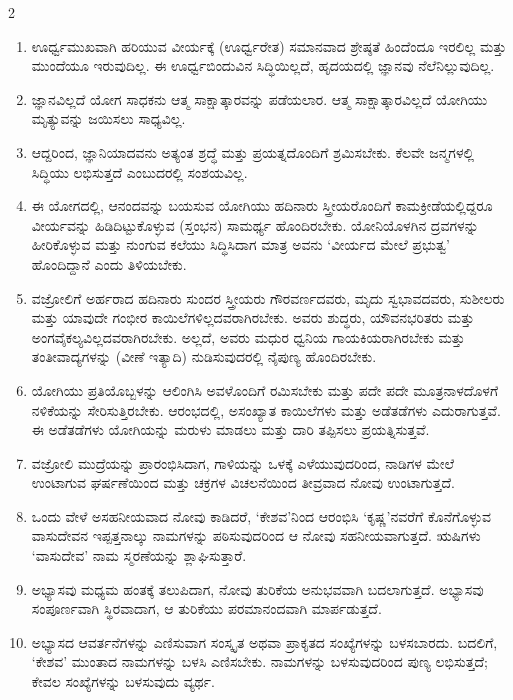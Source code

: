 \begin{multicols}{2}
\begin{kan}


\begin{enumerate}[nosep]
\item[38.] ಊರ್ಧ್ವಮುಖವಾಗಿ ಹರಿಯುವ ವೀರ್ಯಕ್ಕೆ (ಊರ್ಧ್ವರೇತ) ಸಮಾನವಾದ ಶ್ರೇಷ್ಠತೆ ಹಿಂದೆಂದೂ ಇರಲಿಲ್ಲ ಮತ್ತು ಮುಂದೆಯೂ ಇರುವುದಿಲ್ಲ. ಈ ಊರ್ಧ್ವಬಿಂದುವಿನ ಸಿದ್ಧಿಯಿಲ್ಲದೆ, ಹೃದಯದಲ್ಲಿ ಜ್ಞಾನವು ನೆಲೆನಿಲ್ಲುವುದಿಲ್ಲ.
\item[39.] ಜ್ಞಾನವಿಲ್ಲದೆ ಯೋಗ ಸಾಧಕನು ಆತ್ಮ ಸಾಕ್ಷಾತ್ಕಾರವನ್ನು ಪಡೆಯಲಾರ. ಆತ್ಮ ಸಾಕ್ಷಾತ್ಕಾರವಿಲ್ಲದೆ ಯೋಗಿಯು ಮೃತ್ಯುವನ್ನು ಜಯಿಸಲು ಸಾಧ್ಯವಿಲ್ಲ.
\item[40.] ಆದ್ದರಿಂದ, ಜ್ಞಾನಿಯಾದವನು ಅತ್ಯಂತ ಶ್ರದ್ಧೆ ಮತ್ತು ಪ್ರಯತ್ನದೊಂದಿಗೆ ಶ್ರಮಿಸಬೇಕು. ಕೆಲವೇ ಜನ್ಮಗಳಲ್ಲಿ ಸಿದ್ಧಿಯು ಲಭಿಸುತ್ತದೆ ಎಂಬುದರಲ್ಲಿ ಸಂಶಯವಿಲ್ಲ.
\item[41.] ಈ ಯೋಗದಲ್ಲಿ, ಆನಂದವನ್ನು ಬಯಸುವ ಯೋಗಿಯು ಹದಿನಾರು ಸ್ತ್ರೀಯರೊಂದಿಗೆ ಕಾಮಕ್ರೀಡೆಯಲ್ಲಿದ್ದರೂ ವೀರ್ಯವನ್ನು ಹಿಡಿದಿಟ್ಟುಕೊಳ್ಳುವ (ಸ್ತಂಭನ) ಸಾಮರ್ಥ್ಯ ಹೊಂದಿರಬೇಕು. ಯೋನಿಯೊಳಗಿನ ದ್ರವಗಳನ್ನು ಹೀರಿಕೊಳ್ಳುವ ಮತ್ತು ನುಂಗುವ ಕಲೆಯು ಸಿದ್ಧಿಸಿದಾಗ ಮಾತ್ರ ಅವನು ‘ವೀರ್ಯದ ಮೇಲೆ ಪ್ರಭುತ್ವ’ ಹೊಂದಿದ್ದಾನೆ ಎಂದು ತಿಳಿಯಬೇಕು.
\item[42–43.] ವಜ್ರೋಲಿಗೆ ಅರ್ಹರಾದ ಹದಿನಾರು ಸುಂದರ ಸ್ತ್ರೀಯರು ಗೌರವರ್ಣದವರು, ಮೃದು ಸ್ವಭಾವದವರು, ಸುಶೀಲರು ಮತ್ತು ಯಾವುದೇ ಗಂಭೀರ ಕಾಯಿಲೆಗಳಿಲ್ಲದವರಾಗಿರಬೇಕು. ಅವರು ಶುದ್ಧರು, ಯೌವನಭರಿತರು ಮತ್ತು ಅಂಗವೈಕಲ್ಯವಿಲ್ಲದವರಾಗಿರಬೇಕು. ಅಲ್ಲದೆ, ಅವರು ಮಧುರ ಧ್ವನಿಯ ಗಾಯಕಿಯರಾಗಿರಬೇಕು ಮತ್ತು ತಂತೀವಾದ್ಯಗಳನ್ನು (ವೀಣೆ ಇತ್ಯಾದಿ) ನುಡಿಸುವುದರಲ್ಲಿ ನೈಪುಣ್ಯ ಹೊಂದಿರಬೇಕು.
\item[44.] ಯೋಗಿಯು ಪ್ರತಿಯೊಬ್ಬಳನ್ನು ಆಲಿಂಗಿಸಿ ಅವಳೊಂದಿಗೆ ರಮಿಸಬೇಕು ಮತ್ತು ಪದೇ ಪದೇ ಮೂತ್ರನಾಳದೊಳಗೆ ನಳಿಕೆಯನ್ನು ಸೇರಿಸುತ್ತಿರಬೇಕು. ಆರಂಭದಲ್ಲಿ, ಅಸಂಖ್ಯಾತ ಕಾಯಿಲೆಗಳು ಮತ್ತು ಅಡೆತಡೆಗಳು ಎದುರಾಗುತ್ತವೆ. ಈ ಅಡೆತಡೆಗಳು ಯೋಗಿಯನ್ನು ಮರುಳು ಮಾಡಲು ಮತ್ತು ದಾರಿ ತಪ್ಪಿಸಲು ಪ್ರಯತ್ನಿಸುತ್ತವೆ.
\item[45.] ವಜ್ರೋಲಿ ಮುದ್ರೆಯನ್ನು ಪ್ರಾರಂಭಿಸಿದಾಗ, ಗಾಳಿಯನ್ನು ಒಳಕ್ಕೆ ಎಳೆಯುವುದರಿಂದ, ನಾಡಿಗಳ ಮೇಲೆ ಉಂಟಾಗುವ ಘರ್ಷಣೆಯಿಂದ ಮತ್ತು ಚಕ್ರಗಳ ವಿಚಲನೆಯಿಂದ ತೀವ್ರವಾದ ನೋವು ಉಂಟಾಗುತ್ತದೆ.
\item[46.] ಒಂದು ವೇಳೆ ಅಸಹನೀಯವಾದ ನೋವು ಕಾಡಿದರೆ, ‘ಕೇಶವ’ನಿಂದ ಆರಂಭಿಸಿ ‘ಕೃಷ್ಣ’ನವರೆಗೆ ಕೊನೆಗೊಳ್ಳುವ ವಾಸುದೇವನ ಇಪ್ಪತ್ತನಾಲ್ಕು ನಾಮಗಳನ್ನು ಪಠಿಸುವುದರಿಂದ ಆ ನೋವು ಸಹನೀಯವಾಗುತ್ತದೆ. ಋಷಿಗಳು ‘ವಾಸುದೇವ’ ನಾಮ ಸ್ಮರಣೆಯನ್ನು ಶ್ಲಾಘಿಸುತ್ತಾರೆ.
\item[47.] ಅಭ್ಯಾಸವು ಮಧ್ಯಮ ಹಂತಕ್ಕೆ ತಲುಪಿದಾಗ, ನೋವು ತುರಿಕೆಯ ಅನುಭವವಾಗಿ ಬದಲಾಗುತ್ತದೆ. ಅಭ್ಯಾಸವು ಸಂಪೂರ್ಣವಾಗಿ ಸ್ಥಿರವಾದಾಗ, ಆ ತುರಿಕೆಯು ಪರಮಾನಂದವಾಗಿ ಮಾರ್ಪಡುತ್ತದೆ.
\item[48.] ಅಭ್ಯಾಸದ ಆವರ್ತನೆಗಳನ್ನು ಎಣಿಸುವಾಗ ಸಂಸ್ಕೃತ ಅಥವಾ ಪ್ರಾಕೃತದ ಸಂಖ್ಯೆಗಳನ್ನು ಬಳಸಬಾರದು. ಬದಲಿಗೆ, ‘ಕೇಶವ’ ಮುಂತಾದ ನಾಮಗಳನ್ನು ಬಳಸಿ ಎಣಿಸಬೇಕು. ನಾಮಗಳನ್ನು ಬಳಸುವುದರಿಂದ ಪುಣ್ಯ ಲಭಿಸುತ್ತದೆ; ಕೇವಲ ಸಂಖ್ಯೆಗಳನ್ನು ಬಳಸುವುದು ವ್ಯರ್ಥ.
\end{enumerate}
\vskip 7pt


\end{kan}
\end{multicols}
